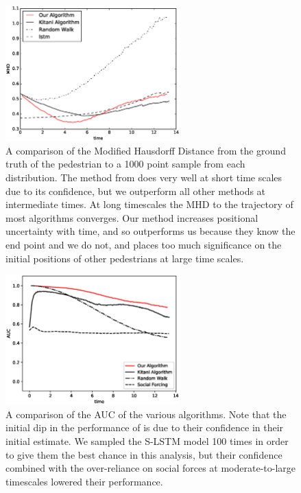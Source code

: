 \documentclass[usenames,dvipsnames]{article}
\begin{document}
\begin{enumerate}
\begin{item}
\end{item}
\begin{figure}
	\centering
	\includegraphics[width=0.6\textwidth]{figures/mhd_results.eps}
	\caption{A comparison of the Modified Hausdorff Distance from the ground truth of the pedestrian to a 1000 point sample from each distribution. The method from \cite{Alahi2016} does very well at short time scales due to its confidence, but we outperform all other methods at intermediate times. At long timescales the MHD to the trajectory of most algorithms converges. Our method increases positional uncertainty with time, and so \cite{Kitani2012} outperforms us because they know the end point and we do not, and \cite{Alahi2016} places too much significance on the initial positions of other pedestrians at large time scales.}
	\label{MHD}
\end{figure}

\begin{figure}
	\centering
	\includegraphics[width=0.6\textwidth]{figures/the_results.eps}
	\caption{A comparison of the AUC of the various algorithms. Note that the initial dip in the performance of \cite{Kitani2012} is due to their confidence in their initial estimate. We sampled the S-LSTM \cite{Alahi2016} model 100 times in order to give them the best chance in this analysis, but their confidence combined with the over-reliance on social forces at moderate-to-large timescales lowered their performance.}
	\label{AUC}
\end{figure}


\end{enumerate}
\end{document}
